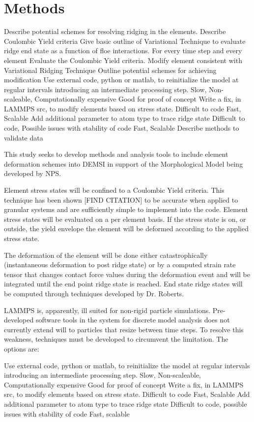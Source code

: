 \section{Methods}
\begin{outline}[enumerate]
\1 Describe potential schemes for resolving ridging in the elements.
\2 Describe Coulombic Yield criteria
\2 Give basic outline of Variational Technique to evaluate ridge end state as a function of floe interactions.
\2 For every time step and every element
\3 Evaluate the Coulombic Yield criteria.
\3 Modify element consistent with Variational Ridging Technique
\2 Outline potential schemes for achieving modification
\3 Use external code, python or matlab, to reinitialize the model at regular intervals introducing an intermediate processing step.
\4 Slow, Non-scaleable, Computationally expensive
\4 Good for proof of concept
\3 Write a fix, in LAMMPS src, to modify elements based on stress state.
\4 Difficult to code
\4 Fast, Scalable
\3 Add additional parameter to atom type to trace ridge state
\4 Difficult to code, Possible issues with stability of code
\4 Fast, Scalable
\2 Describe methods to validate data
\end{outline}

This study seeks to develop methods and analysis tools to include element deformation schemes into \ac{DEMSI} in support of the Morphological Model being developed by \ac{NPS}.

Element stress states will be confined to a Coulombic Yield criteria.  This technique has been shown [FIND CITATION] to be accurate when applied to granular systems and are sufficiently simple to implement into the code.  Element stress states will be evaluated on a per element basis.  If the stress state is on, or outside, the yield envelope the element will be deformed according to the applied stress state.

The deformation of the element will be done either catastrophically (instantaneous deformation to post ridge state) or by a computed strain rate tensor that changes contact force values during the deformation event and will be integrated until the end point ridge state is reached.  End state ridge states will be computed through techniques developed by Dr. Roberts.

\ac{LAMMPS} is, apparently, ill suited for non-rigid particle simulations.  Pre-developed software tools in the system for discrete model analysis does not currently extend will to particles that resize between time steps.  To resolve this weakness, techniques must be developed to circumvent the limitation.  The options are:
\begin{outline}
\1 Use external code, python or matlab, to reinitialize the model at regular intervals introducing an intermediate processing step.
\2 Slow, Non-scaleable, Computationally expensive
\2 Good for proof of concept
\1 Write a fix, in LAMMPS src, to modify elements based on stress state.
\2 Difficult to code
\2 Fast, Scalable
\1 Add additional parameter to atom type to trace ridge state
\2 Difficult to code, possible issues with stability of code
\2 Fast, scalable
\end{outline}

